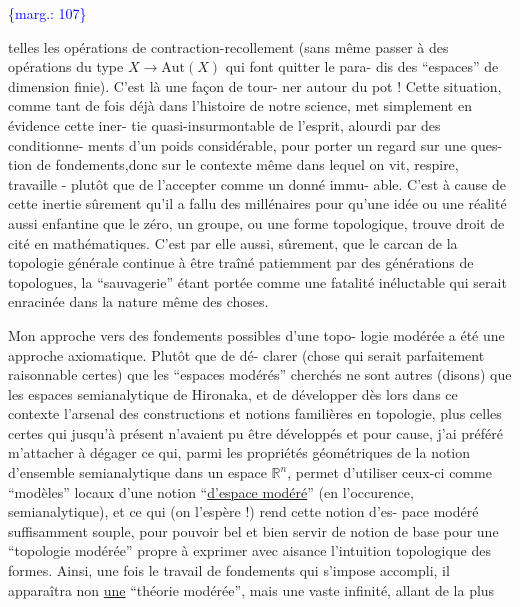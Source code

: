 \documentclass[11pt]{article}
\newcommand{\scanpage}[1]{\par\bigskip\noindent{\small\sffamily[scan #1]}\par}
\newcommand{\mspage}[1]{{\small\sffamily[p.\,#1]}}
\newcommand{\margin}[1]{\textcolor{blue}{\{\textsf{marg.:} #1\}}}
\newcommand{\uline}[1]{\underline{#1}}
\begin{document}
\margin{107}

\clearpage
\scanpage{119/108}
\mspage{30}

telles les opérations de contraction-recollement (sans même passer
à des opérations du type $X \longrightarrow \mathrm{Aut}(X)$ qui font quitter le para-%
dis des ``espaces'' de dimension finie). C'est là une façon de tour-%
ner autour du pot ! Cette situation, comme tant de fois déjà dans
l'histoire de notre science, met simplement en évidence cette iner-%
tie quasi-insurmontable de l'esprit, alourdi par des conditionne-%
ments d'un poids considérable, pour porter un regard sur une ques-%
tion de fondements,donc sur le contexte même dans lequel on vit,
respire, travaille - plutôt que de l'accepter comme un donné immu-%
able. C'est à cause de cette inertie sûrement qu'il a fallu des
millénaires pour qu'une idée ou une réalité aussi enfantine que
le zéro, un groupe, ou une forme topologique, trouve droit de cité
en mathématiques. C'est par elle aussi, sûrement, que le carcan
de la topologie générale continue à être traîné patiemment par
des générations de topologues, la ``sauvagerie'' étant portée comme
une fatalité inéluctable qui serait enracinée dans la nature même
des choses.

Mon approche vers des fondements possibles d'une topo-%
logie modérée a été une approche axiomatique. Plutôt que de dé-%
clarer (chose qui serait parfaitement raisonnable certes) que
les ``espaces modérés'' cherchés ne sont autres (disons) que les
espaces semianalytique de Hironaka, et de développer dès lors dans
ce contexte l'arsenal des constructions et notions familières en
topologie, plus celles certes qui jusqu'à présent n'avaient pu
être développés et pour cause, j'ai préféré m'attacher à dégager
ce qui, parmi les propriétés géométriques de la notion d'ensemble
semianalytique dans un espace $\mathbb{R}^{n}$, permet d'utiliser ceux-ci comme
``modèles'' locaux d'une notion ``\uline{d'espace modéré}'' (en l'occurence,
semianalytique), et ce qui (on l'espère !) rend cette notion d'es-%
pace modéré suffisamment souple, pour pouvoir bel et bien servir
de notion de base pour une ``topologie modérée'' propre à exprimer
avec aisance l'intuition topologique des formes. Ainsi, une fois
le travail de fondements qui s'impose accompli, il apparaîtra non
\uline{une} ``théorie modérée'', mais une vaste infinité, allant de la plus
\end{document}
